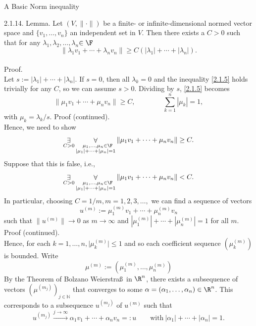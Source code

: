 \documentclass[smaller,hyperref={CJKbookmarks=true}]{beamer}
\newcommand{\N}{\mathbb{N}}
\newcommand{\myseries}[2]{$#1_1,#1_2,\dots,#1_#2$}
\begin{document}
\begin{frame}{A Basic Norm inequality}
\begin{spacing}{1.1}
\alert{2.1.14. Lemma.} Let $(V,\|\cdot\|)$ be a finite- or infinite-dimensional normed vector space and $\{v_1,\ldots,v_n\}$ an independent set in $V$. Then there exists a $C>0$ such that for any \myseries{\lambda}{n}$\in\F$
\begin{equation}\label{2.1.5}
  \|\lambda_1v_1+\cdots+\lambda_nv_n\|\geq C\left(|\lambda_1|+\cdots+|\lambda_n|\right).
\end{equation}
 \\[8pt]
\alert{Proof.}\\
Let $s:=|\lambda_1|+\cdots+|\lambda_n|$. If $s=0$, then all $\lambda_k=0$ and the inequality \eqref{2.1.5} holds trivially for any $C$, so we can assume $s>0$. Dividing by $s$, \eqref{2.1.5} becomes
\begin{equation}\label{2.1.6}
  \|\mu_1v_1+\cdots+\mu_nv_n\|\geq C,\qquad\qquad\sum_{k=1}^{n}|\mu_k|=1,
\end{equation}
with $\mu_k=\lambda_k/s.$
\newpage
\alert{Proof (continued).}\\
Hence, we need to show
\[\mathop{\exists}_{C>0}\mathop{\forall}_{\begin{subarray}~~~~\mu_1,\ldots,\mu_n\in\F\\|\mu_1|+\cdots+|\mu_n|=1\end{subarray}}\|\mu_1v_1+\cdots+\mu_nv_n\|\geq C.\]
Suppose that this is false, i.e.,
\[\mathop{\exists}_{C>0}\mathop{\forall}_{\begin{subarray}~~~~\mu_1,\ldots,\mu_n\in\F\\|\mu_1|+\cdots+|\mu_n|=1\end{subarray}}\|\mu_1v_1+\cdots+\mu_nv_n\|< C.\]
In particular, choosing $C=1/m,m=1,2,3,\ldots,$ we can find a sequence of vectors
\[u^{(m)}:=\mu_1^{(m)}v_1+\cdots+\mu_n^{(m)}v_n\]
such that $\|u^{(m)}\|\to 0$ as $m\to\infty$ and $|\mu_1^{(m)}|+\cdots+|\mu_n^{(m)}|=1$ for all $m$.
\newpage
\alert{Proof (continued).}\\
Hence, for each $k=1,\ldots,n,\big|\mu_k^{(m)}\big|\leq1$ and so each coef{}ficient sequence $(\mu_k^{(m)})$ is bounded. Write
\[\mu^{(m)}:=(\mu_1^{(m)},\ldots,\mu_n^{(m)})\]
By the Theorem of Bolzano Weierstra\ss~in $\R^n$, there exists a subsequence of vectors $(\mu^{(m_j)})_{j\in\N}$ that converges to some $\alpha=(\alpha_1,\ldots,\alpha_n)\in\R^n$. This corresponds to a subsequence $u^{(m_j)}$ of $u^{(m)}$ such that
\[u^{(m_j)}\xrightarrow[]{j\to\infty}\alpha_1v_1+\cdots+\alpha_nv_n=:u\qquad\text{with}~|\alpha_1|+\cdots+|\alpha_n|=1.\]

\end{spacing}
\end{frame}
\end{document}
